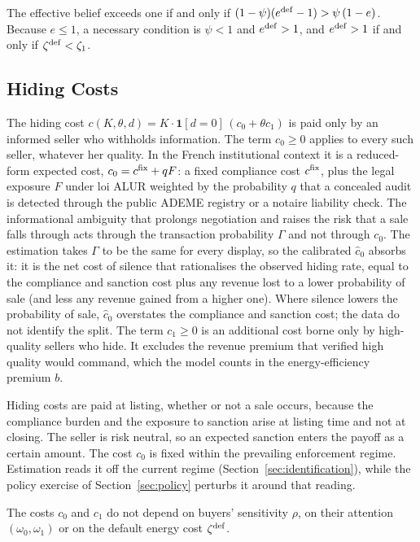 The effective belief exceeds one if and only if $(1-\psi)(e^{\rm def}-1)>\psi\,(1-e)$. Because $e\le1$, a necessary condition is $\psi<1$ and $e^{\rm def}>1$, and $e^{\rm def}>1$ if and only if $\zeta^{\rm def}<\zeta_1$.

\subsection*{Hiding Costs}
\label{app:hiding_costs}

The hiding cost $c(K,\theta,d)=K\cdot\mathbf 1[d=0]\,(c_0+\theta c_1)$ is paid only by an informed seller who withholds information. The term $c_0\ge0$ applies to every such seller, whatever her quality. In the French institutional context it is a reduced-form expected cost, $c_0=c^{\rm fix}+qF$: a fixed compliance cost $c^{\rm fix}$, plus the legal exposure $F$ under loi ALUR weighted by the probability $q$ that a concealed audit is detected through the public ADEME registry or a notaire liability check. The informational ambiguity that prolongs negotiation and raises the risk that a sale falls through acts through the transaction probability $\Gamma$ and not through $c_0$. The estimation takes $\Gamma$ to be the same for every display, so the calibrated $\hat c_0$ absorbs it: it is the net cost of silence that rationalises the observed hiding rate, equal to the compliance and sanction cost plus any revenue lost to a lower probability of sale (and less any revenue gained from a higher one). Where silence lowers the probability of sale, $\hat c_0$ overstates the compliance and sanction cost; the data do not identify the split. The term $c_1\ge0$ is an additional cost borne only by high-quality sellers who hide. It excludes the revenue premium that verified high quality would command, which the model counts in the energy-efficiency premium $b$.

Hiding costs are paid at listing, whether or not a sale occurs, because the compliance burden and the exposure to sanction arise at listing time and not at closing. The seller is risk neutral, so an expected sanction enters the payoff as a certain amount. The cost $c_0$ is fixed within the prevailing enforcement regime. Estimation reads it off the current regime (Section~\ref{sec:identification}), while the policy exercise of Section~\ref{sec:policy} perturbs it around that reading.

\begin{assumption}
\label{assum:c_indep}
The costs $c_0$ and $c_1$ do not depend on buyers' sensitivity $\rho$, on their attention $(\omega_0,\omega_1)$ or on the default energy cost $\zeta^{\rm def}$.
\end{assumption}

